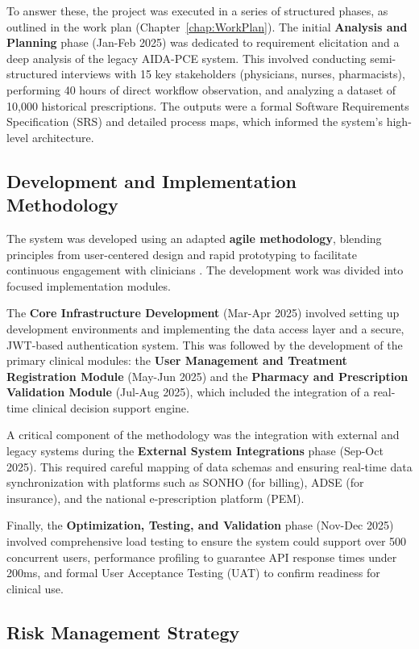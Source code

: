 To answer these, the project was executed in a series of structured phases, as outlined in the work plan (Chapter~\ref{chap:WorkPlan}). The initial \textbf{Analysis and Planning} phase (Jan-Feb 2025) was dedicated to requirement elicitation and a deep analysis of the legacy AIDA-PCE system. This involved conducting semi-structured interviews with 15 key stakeholders (physicians, nurses, pharmacists), performing 40 hours of direct workflow observation, and analyzing a dataset of 10,000 historical prescriptions. The outputs were a formal Software Requirements Specification (SRS) and detailed process maps, which informed the system's high-level architecture.

\subsection{Development and Implementation Methodology}

The system was developed using an adapted \textbf{agile methodology}, blending principles from user-centered design and rapid prototyping to facilitate continuous engagement with clinicians \cite{fowler2018}. The development work was divided into focused implementation modules.

The \textbf{Core Infrastructure Development} (Mar-Apr 2025) involved setting up development environments and implementing the data access layer and a secure, JWT-based authentication system. This was followed by the development of the primary clinical modules: the \textbf{User Management and Treatment Registration Module} (May-Jun 2025) and the \textbf{Pharmacy and Prescription Validation Module} (Jul-Aug 2025), which included the integration of a real-time clinical decision support engine.

A critical component of the methodology was the integration with external and legacy systems during the \textbf{External System Integrations} phase (Sep-Oct 2025). This required careful mapping of data schemas and ensuring real-time data synchronization with platforms such as SONHO (for billing), ADSE (for insurance), and the national e-prescription platform (PEM).

Finally, the \textbf{Optimization, Testing, and Validation} phase (Nov-Dec 2025) involved comprehensive load testing to ensure the system could support over 500 concurrent users, performance profiling to guarantee API response times under 200ms, and formal User Acceptance Testing (UAT) to confirm readiness for clinical use.

\subsection{Risk Management Strategy}

